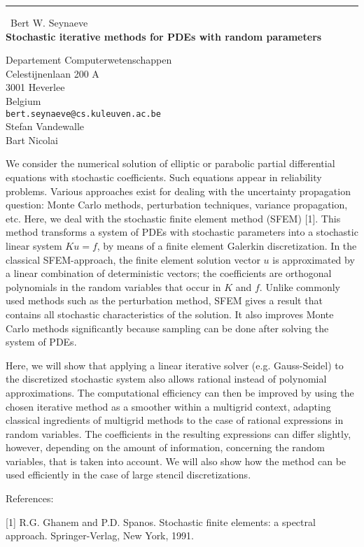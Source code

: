 \documentclass{report}
\begin{document}
\begin{center}
\rule{6in}{1pt} \
{\large Bert W. Seynaeve \\
{\bf Stochastic iterative methods for PDEs with random parameters}}

Departement Computerwetenschappen \\ Celestijnenlaan 200 A \\ 3001 Heverlee \\ Belgium
\\
{\tt bert.seynaeve@cs.kuleuven.ac.be}\\
Stefan Vandewalle\\
Bart Nicolai\end{center}

We consider the numerical solution of elliptic or parabolic
partial differential equations with stochastic coefficients.
Such equations appear in reliability problems. Various
approaches exist for dealing with the uncertainty propagation
question: Monte Carlo methods, perturbation techniques, variance
propagation, etc. Here, we deal with the stochastic finite
element method (SFEM) [1]. This method transforms a system of
PDEs with stochastic parameters into a stochastic linear system
$Ku = f$, by means of a finite element Galerkin discretization.
In the classical SFEM-approach, the finite element solution
vector $u$ is approximated by a linear combination of
deterministic vectors; the coefficients are orthogonal
polynomials in the random variables that occur in $K$ and $f$.
Unlike commonly used methods such as the perturbation method,
SFEM gives a result that contains all stochastic characteristics
of the solution. It also improves Monte Carlo methods
significantly because sampling can be done after solving the
system of PDEs.

Here, we will show that applying a linear iterative solver
(e.g. Gauss-Seidel) to the discretized stochastic system also
allows rational instead of polynomial approximations. The
computational efficiency can then be improved by using the
chosen iterative method as a smoother within a multigrid
context, adapting classical ingredients of multigrid methods to
the case of rational expressions in random variables. The
coefficients in the resulting expressions can differ slightly,
however, depending on the amount of information, concerning the
random variables, that is taken into account. We will also show
how the method can be used efficiently in the case of large
stencil discretizations.


References:

[1] R.G. Ghanem and P.D. Spanos. Stochastic finite elements:
a spectral approach. Springer-Verlag, New York, 1991.
\end{document}
